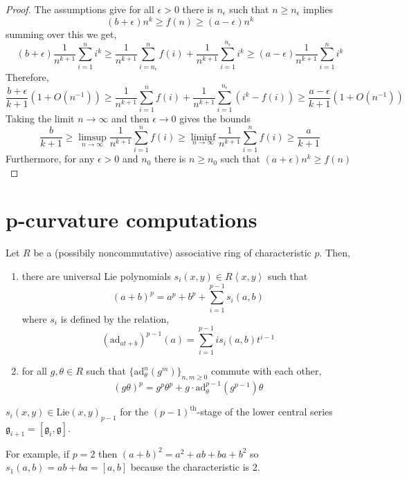 \documentclass[12pt]{article}
\newcommand{\ad}{\mathrm{ad}}
\begin{document}
\begin{proof}
The assumptions give for all $\epsilon > 0$ there is $n_\epsilon$ such that $n \ge n_\epsilon$ implies 
\[ (b + \epsilon) n^k \ge f(n) \ge (a - \epsilon) n^k \]
summing over this we get,
\[ (b + \epsilon) \frac{1}{n^{k+1}} \sum_{i = 1}^n i^k \ge \frac{1}{n^{k+1}} \sum_{i = n_\epsilon}^n f(i) + \frac{1}{n^{k+1}} \sum_{i = 1}^{n_\epsilon} i^k \ge (a - \epsilon) \frac{1}{n^{k+1}} \sum_{i = 1}^n i^k \]
Therefore,
\[ \frac{b + \epsilon}{k + 1} (1 + O(n^{-1})) \ge \frac{1}{n^{k+1}} \sum_{i = 1}^n f(i) + \frac{1}{n^{k+1}} \sum_{i = 1}^{n_\epsilon} (i^k - f(i)) \ge \frac{a - \epsilon}{k+1} (1 + O(n^{-1}))  \]
Taking the limit $n \to \infty$ and then $\epsilon \to 0$ gives the bounds
\[ \frac{b}{k+1} \ge \limsup_{n \to \infty} \frac{1}{n^{k+1}} \sum_{i = 1}^n f(i) \ge \liminf_{n \to \infty} \frac{1}{n^{k+1}} \sum_{i = 1}^n f(i) \ge \frac{a}{k+1}  \]
Furthermore, for any $\epsilon > 0$ and $n_0$ there is $n \ge n_0$ such that $(a + \epsilon) n^k \ge f(n)$ 
\end{proof}

\section{p-curvature computations}

\newcommand{\Lie}{\mathrm{Lie}}
\newcommand{\g}{\mathfrak{g}}

\begin{lemma}
Let $R$ be a (possibily noncommutative) associative ring of characteristic $p$. Then,
\begin{enumerate}
\item there are universal Lie polynomials $s_i(x,y) \in R \left< x, y \right>$ such that
\[ (a + b)^p = a^p + b^p + \sum_{i = 1}^{p-1} s_i(a,b) \]
where $s_i$ is defined by the relation,
\[ (\ad_{a t + b})^{p-1}(a) = \sum_{i = 1}^{p-1} i s_i(a,b) t^{i-1} \]
\item for all $g, \theta \in R$ such that $\{ \ad_{\theta}^n(g^m) \}_{n,m \ge 0}$ commute with each other,
\[ (g \theta)^p = g^p \theta^p + g \cdot \ad_{\theta}^{p-1}(g^{p-1}) \theta \]
\end{enumerate}
\end{lemma}

\begin{rmk}
$s_i(x,y) \in \Lie(x,y)_{p-1}$ for the $(p-1)^{\text{th}}$-stage of the lower central series $\g_{i+1} = [\g_i, \g]$.
\end{rmk}


\begin{example}
For example, if $p = 2$ then $(a + b)^2 = a^2 + ab + ba + b^2$ so $s_1(a,b) = ab + ba = [a,b]$ because the characteristic is 2.
\end{example}
\end{document}
